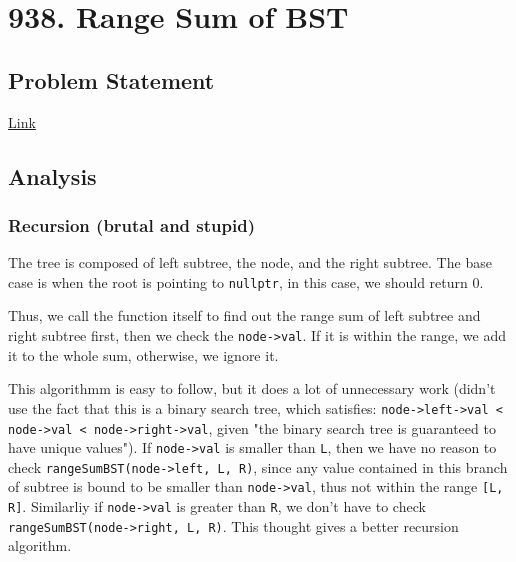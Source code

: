 \documentclass[12pt]{book}
\begin{document}
\chapter{938. Range Sum of BST}
\label{sec:org6141ee6}
\section{Problem Statement}
\label{sec:orgff8eab8}
\href{https://leetcode.com/problems/range-sum-of-bst/}{Link}
\section{Analysis}
\label{sec:org45e68d8}
\subsection{Recursion (brutal and stupid)}
\label{sec:org16ef3c3}
The tree is composed of left subtree, the node, and the right subtree. The base case is when the root is pointing to \texttt{nullptr}, in this case, we should return 0.

Thus, we call the function itself to find out the range sum of left subtree and right subtree first, then we check the \texttt{node->val}. If it is within the range, we add it to the whole sum, otherwise, we ignore it.

This algorithmm is easy to follow, but it does a lot of unnecessary work (didn't use the fact that this is a binary search tree, which satisfies: \texttt{node->left->val < node->val < node->right->val}, given "the binary search tree is guaranteed to have unique values"). If \texttt{node->val} is smaller than \texttt{L}, then we have no reason to check \texttt{rangeSumBST(node->left, L, R)}, since any value contained in this branch of subtree is bound to be smaller than \texttt{node->val}, thus not within the range \texttt{[L, R]}. Similarliy if \texttt{node->val} is greater than \texttt{R}, we don't have to check \texttt{rangeSumBST(node->right, L, R)}. This thought gives a better recursion algorithm.
\end{document}
